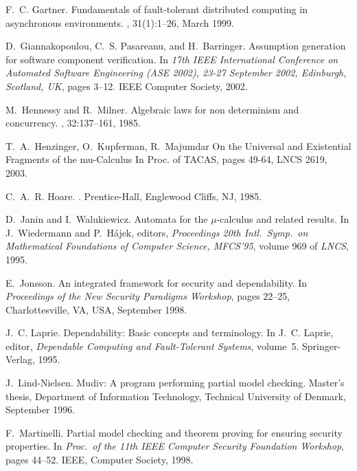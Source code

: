 \documentclass{entcs}
\begin{document}
\begin{thebibliography}{10}
 F.~C. Gartner.  \newblock Fundamentals of fault-tolerant
  distributed computing in asynchronous environments.  , 31(1):1--26, March 1999.

 D.~Giannakopoulou, C.~S. Pasareanu, and H.~Barringer.
  \newblock Assumption generation for software component verification.
  \newblock In {\em 17th IEEE International Conference on Automated Software
    Engineering (ASE 2002), 23-27 September 2002, Edinburgh, Scotland, UK},
  pages 3--12. IEEE Computer Society, 2002.

 M.~Hennessy and R.~Milner.  \newblock Algebraic laws for
  non determinism and concurrency.  ,
  32:137--161, 1985.

 T.~A.~Henzinger, O.~Kupferman, R.~Majumdar \newblock On the
  Universal and Existential Fragments of the mu-Calculus \newblock In Proc. of
  TACAS, pages 49-64, LNCS 2619, 2003.

 C.~A.~R. Hoare.  .  \newblock Prentice-Hall, Englewood Cliffs, NJ, 1985.

 D.~Janin and I.~Walukiewicz.  \newblock Automata for the
  $\mu$-calculus and related results.  \newblock In J.~Wiedermann and
  P.~H{\'a}jek, editors, {\em Proceedings 20th Intl.\ Symp.\ on Mathematical
    Foundations of Computer Science, MFCS'95}, volume 969 of {\em LNCS}, 1995.

 E.~Jonsson.  \newblock An integrated framework for security
  and dependability.  \newblock In {\em Proceedings of the New Security
    Paradigms Workshop}, pages 22--25, Charlottesville, VA, USA, September
  1998.

 J.~C. Laprie.  \newblock Dependability: Basic concepts and
  terminology.  \newblock In J.~C. Laprie, editor, {\em Dependable Computing
    and Fault-Tolerant Systems}, volume~5. Springer-Verlag, 1995.

 J.~Lind-Nielsen.  \newblock Mudiv: A program performing
  partial model checking.  \newblock Master's thesis, Department of
  Information Technology, Technical University of Denmark, September 1996.

 F.~Martinelli.  \newblock Partial model checking and
  theorem proving for ensuring security properties.  \newblock In {\em
    Proc.~of the 11th IEEE Computer Security Foundation Workshop}, pages
  44--52. IEEE, Computer Society, 1998.


\end{thebibliography}
\end{document}
